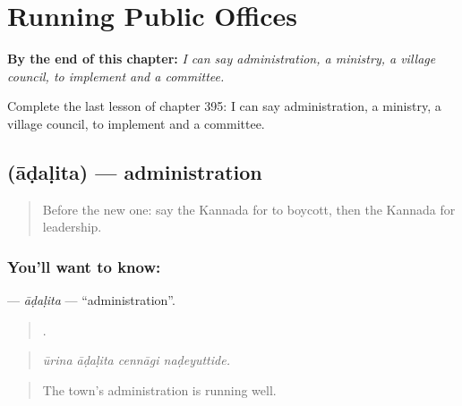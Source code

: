 
\chapter{Running Public Offices}
\label{ch:ka-running-public-offices}

\begin{chapteropening}
\textbf{By the end of this chapter:} \emph{I can say administration, a ministry, a village council, to implement and a committee.}

Complete the last lesson of chapter 395: I can say administration, a ministry, a village council, to implement and a committee.
\end{chapteropening}

\section[\texorpdfstring{\kn{ಆಡಳಿತ} (āḍaḷita)}{ಆಡಳಿತ (āḍaḷita)}]{ (āḍaḷita) — administration}

\label{lesson:KA-C395-adalita}



\begin{quote}
Before the new one: say the Kannada for to boycott, then the Kannada for leadership.
\end{quote}

\subsection*{You'll want to know: }
\textbf{} — \emph{āḍaḷita} — \textquotedblleft{}administration\textquotedblright{}.

\begin{quote}
   .
\end{quote}

\begin{quote}
\emph{ūrina āḍaḷita cennāgi naḍeyuttide.}
\end{quote}

\begin{quote}
The town's administration is running well.
\end{quote}

